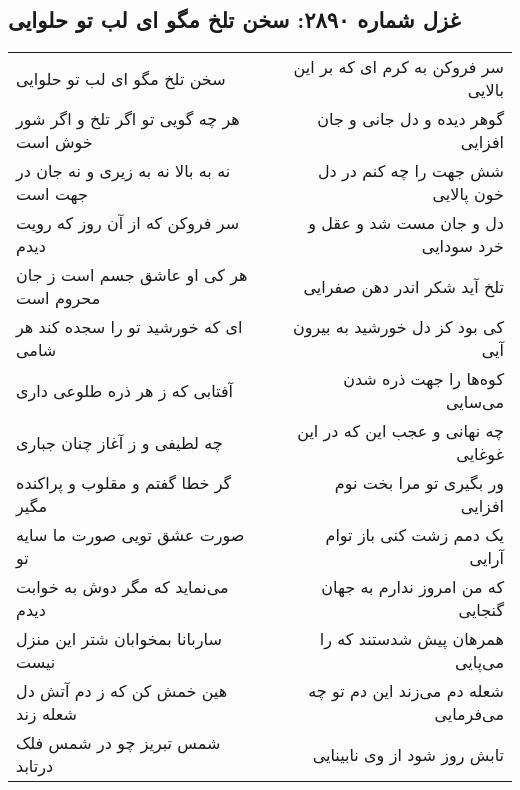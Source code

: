 \begin{center}
\section*{غزل شماره ۲۸۹۰: سخن تلخ مگو ای لب تو حلوایی}
\label{sec:2890}
\begin{longtable}{l p{0.5cm} r}
سخن تلخ مگو ای لب تو حلوایی
&&
سر فروکن به کرم ای که بر این بالایی
\\
هر چه گویی تو اگر تلخ و اگر شور خوش است
&&
گوهر دیده و دل جانی و جان افزایی
\\
نه به بالا نه به زیری و نه جان در جهت است
&&
شش جهت را چه کنم در دل خون پالایی
\\
سر فروکن که از آن روز که رویت دیدم
&&
دل و جان مست شد و عقل و خرد سودایی
\\
هر کی او عاشق جسم است ز جان محروم است
&&
تلخ آید شکر اندر دهن صفرایی
\\
ای که خورشید تو را سجده کند هر شامی
&&
کی بود کز دل خورشید به بیرون آیی
\\
آفتابی که ز هر ذره طلوعی داری
&&
کوه‌ها را جهت ذره شدن می‌سایی
\\
چه لطیفی و ز آغاز چنان جباری
&&
چه نهانی و عجب این که در این غوغایی
\\
گر خطا گفتم و مقلوب و پراکنده مگیر
&&
ور بگیری تو مرا بخت نوم افزایی
\\
صورت عشق تویی صورت ما سایه تو
&&
یک دمم زشت کنی باز توام آرایی
\\
می‌نماید که مگر دوش به خوابت دیدم
&&
که من امروز ندارم به جهان گنجایی
\\
ساربانا بمخوابان شتر این منزل نیست
&&
همرهان پیش شدستند که را می‌پایی
\\
هین خمش کن که ز دم آتش دل شعله زند
&&
شعله دم می‌زند این دم تو چه می‌فرمایی
\\
شمس تبریز چو در شمس فلک درتابد
&&
تابش روز شود از وی نابینایی
\\
\end{longtable}
\end{center}
